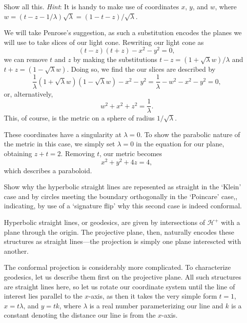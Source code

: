\documentclass[../road-to-reality.tex]{subfiles}
\begin{document}
\begin{questions}
\question Show all this. \textit{Hint}: It is handy to make use of coordinates $x$, $y$, and $w$, where $w = (t - z - 1/\lambda)\sqrt{\lambda} = (1-t-z)/\sqrt{\lambda}$.

  \begin{solution}
    We will take Penrose's suggestion, as such a substitution encodes the planes we will use to take slices of our light cone. Rewriting our light cone as
    \[
      (t-z)(t+z) - x^2 - y^2 = 0,
    \]
    we can remove $t$ and $z$ by making the substitutions $t-z = (1+\sqrt{\lambda}w)/\lambda$ and $t+z=(1-\sqrt{\lambda}w)$. Doing so, we find the our slices are described by
    \[
      \frac{1}{\lambda}(1+\sqrt{\lambda}w)(1-\sqrt{\lambda}w)-x^2-y^2 = \frac{1}{\lambda} - w^2 - x^2 - y^2 = 0,
    \]
    or, alternatively,
    \[
      w^2 + x^2 + z^2 = \frac{1}{\lambda}.
    \]
    This, of course, is the metric on a sphere of radius $1/\sqrt{\lambda}$.

    These coordinates have a singularity at $\lambda = 0$. To show the parabolic nature of the metric in this case, we simply set $\lambda=0$ in the equation for our plane, obtaining $z + t = 2$. Removing $t$, our metric becomes
    \[
      x^2+y^2+4z = 4,
    \]
    which describes a paraboloid.
  \end{solution}

\question Show why the hyperbolic straight lines are repesented as straight in the `Klein' case and by circles meeting the boundary orthogonally in the `Poincare' case,, indicating, by use of a `signature flip' why this second case is indeed conformal.

  \begin{solution}
    Hyperbolic straight lines, or geodesics, are given by intersections of $\mathcal{H}^+$ with a plane through the origin. The projective plane, then, naturally encodes these structures as straight lines---the projection is simply one plane interescted with another.

    The conformal projection is considerably more complicated. To characterize geodesics, let us describe them first on the projective plane. All such structures are straight lines here, so let us rotate our coordinate system until the line of interest lies parallel to the $x$-axis, as then it takes the very simple form $t=1$, $x = t\lambda$, and $y = tk$, where $\lambda$ is a real number parameterizing our line and $k$ is a constant denoting the distance our line is from the $x$-axis.


\end{solution}
\end{questions}
\end{document}
